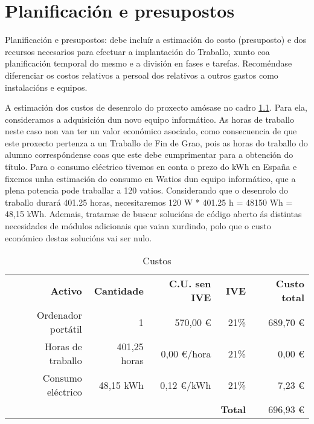 \chapter{Planificación e presupostos}

Planificación e presupostos: debe incluír a estimación do costo (presuposto) e dos 
recursos necesarios para efectuar a implantación do Traballo, xunto coa planificación 
temporal do mesmo e a división en fases e tarefas. Recoméndase diferenciar os costos relativos a persoal dos relativos a outros gastos como instalacións e equipos.

A estimación dos custos de desenrolo do proxecto amósase no cadro \ref{tab:custosLabel}. Para ela, consideramos a adquisición dun novo equipo informático. As horas de traballo neste caso non van ter un valor económico asociado, como consecuencia de que este proxecto pertenza a un Traballo de Fin de Grao, pois as horas do traballo do alumno correspóndense coas que este debe cumprimentar para a obtención do título. Para o consumo eléctrico tivemos en conta o prezo do kWh en España\cite{preciokWh_espana} e fixemos unha estimación\cite{energyusecalculator} do consumo en Watios dun equipo informático, que a plena potencia pode traballar a 120 vatios. Considerando que o desenrolo  do traballo durará 401.25 horas, necesitaremos 120 W * 401.25 h = 48150 Wh = 48,15 kWh. Ademais, tratarase de buscar solucións de código aberto ás distintas necesidades de módulos adicionais que vaian xurdindo, polo que o custo económico destas solucións vai ser nulo.

\begin{table}[htbp]
  \centering
    \begin{tabular}{rrrrr}
    \textbf{Activo} & \textbf{Cantidade} & \textbf{C.U. sen IVE} & \textbf{IVE} & \textbf{Custo total} \\
    Ordenador portátil & 1     & 570,00 \euro & 21\%  & 689,70 \euro \\
    Horas de traballo & 401,25 horas & 0,00 \euro/hora & 21\%  & 0,00 \euro \\
    Consumo eléctrico & 48,15 kWh & 0,12 \euro/kWh & 21\%  & 7,23 \euro \\
          &       &       & \textbf{Total} & 696,93 \euro \\
    \end{tabular}%
		\caption{Custos}
  \label{tab:custosLabel}%
\end{table}%

